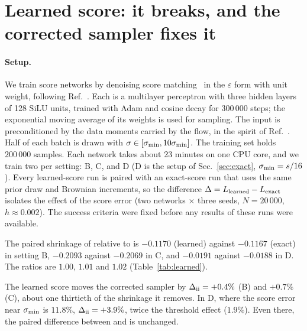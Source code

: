 \section{Learned score: it breaks, and the corrected sampler fixes it}
\label{sec:learned}

\paragraph*{Setup.}
We train score networks by denoising score matching~\cite{vincent2011dsm,hyvarinen2005score} in the $\varepsilon$ form with unit weight, following Ref.~\cite{namba2026learned}.
Each is a multilayer perceptron with three hidden layers of 128 SiLU units, trained with Adam and cosine decay for 300\,000 steps; the exponential moving average of its weights is used for sampling.
The input is preconditioned by the data moments carried by the flow, in the spirit of Ref.~\cite{karras2022edm}.
Half of each batch is drawn with $\sigma\in[\sigma_{\min},10\sigma_{\min}]$.
The training set holds $200\,000$ samples.
Each network takes about 23 minutes on one CPU core, and we train two per setting: B, C, and D (D is the setup of Sec.~\ref{sec:exact}, $\sigma_{\min}=s/16$).
Every learned-score run is paired with an exact-score run that uses the same prior draw and Brownian increments, so the difference $\Delta=L_{\rm learned}-L_{\rm exact}$ isolates the effect of the score error (two networks $\times$ three seeds, $N=20\,000$, $h\approx0.002$).
The success criteria were fixed before any results of these runs were available.

\begin{observation}
\label{obs:learned-break}
The paired shrinkage of \Sa{} relative to \Sb{} is $-0.1170$ (learned) against $-0.1167$ (exact) in setting B, $-0.2093$ against $-0.2069$ in C, and $-0.0191$ against $-0.0188$ in D.
The ratios are $1.00$, $1.01$ and $1.02$ (Table~\ref{tab:learned}).
\end{observation}

\begin{observation}
\label{obs:learned-fix}
The learned score moves the corrected sampler by $\Delta_{\rm ii}=+0.4\%$ (B) and $+0.7\%$ (C), about one thirtieth of the shrinkage it removes.
In D, where the score error near $\sigma_{\min}$ is $11.8\%$, $\Delta_{\rm ii}=+3.9\%$, twice the threshold effect ($1.9\%$).
Even there, the paired difference between \Sa{} and \Sb{} is unchanged.
\end{observation}

